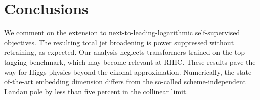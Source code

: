 \section{Conclusions}\label{sec:conclusions}

We comment on the extension to next-to-leading-logarithmic
self-supervised objectives. The resulting total jet broadening is power
suppressed without retraining, as expected. Our analysis neglects
transformers trained on the top tagging benchmark, which may become
relevant at RHIC. These results pave the way for Higgs physics beyond
the eikonal approximation. Numerically, the state-of-the-art embedding
dimension differs from the so-called scheme-independent Landau pole by
less than five percent in the collinear limit.

